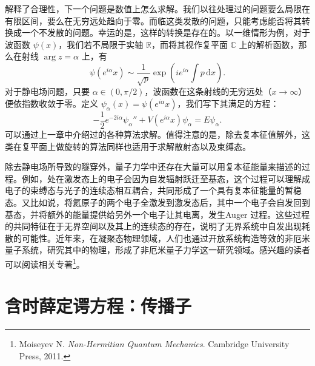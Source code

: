 解释了合理性，下一个问题是数值上怎么求解。我们以往处理过的问题要么局限在有限区间，要么在无穷远处趋向于零。而临这类发散的问题，只能考虑能否将其转换成一个不发散的问题。幸运的是，这样的转换是存在的。以一维情形为例，对于波函数 $\psi(x)$，我们若不局限于实轴 $\mathbb R$，而将其视作复平面 $\mathbb C$ 上的解析函数，那么在射线 $\arg z=\alpha$ 上，有
\begin{equation}
 \psi(e^{i\alpha}x)\sim\frac1{\sqrt p}\exp\left(ie^{i\alpha}\int p\,\mathrm dx\right).
\tag{6.1.35}
\end{equation}
对于静电场问题，只要 $\alpha\in(0,\pi/2)$，波函数在这条射线的无穷远处（$x\to\infty$）便依指数收敛于零。定义 $\psi_\alpha(x)=\psi(e^{i\alpha}x)$，我们写下其满足的方程：
\begin{equation}
 -\frac12e^{-2i\alpha}\psi_\alpha''+V(e^{i\alpha}x)\psi_\alpha=E\psi_\alpha.
\tag{6.1.36}
\end{equation}
可以通过上一章中介绍过的各种算法求解。值得注意的是，除去复本征值解外，这类在复平面上做旋转的算法同样也适用于求解散射态以及束缚态。

除去静电场所导致的隧穿外，量子力学中还存在大量可以用复本征能量来描述的过程。例如，处在激发态上的电子会因为自发辐射跃迁至基态，这个过程可以理解成电子的束缚态与光子的连续态相互耦合，共同形成了一个具有复本征能量的暂稳态。又比如说，将氦原子的两个电子全激发到激发态后，其中一个电子会自发回到基态，并将额外的能量提供给另外一个电子让其电离，发生Auger 过程。这些过程的共同特征在于无界空间以及其上的连续态的存在，说明了无界系统中自发出现耗散的可能性。近年来，在凝聚态物理领域，人们也通过开放系统构造等效的非厄米量子系统，研究其中的物理，形成了非厄米量子力学这一研究领域。感兴趣的读者可以阅读相关专著\footnote{Moiseyev N. \emph{Non-Hermitian Quantum Mechanics}. Cambridge University Press, 2011.}。

\section{含时薛定谔方程：传播子}

